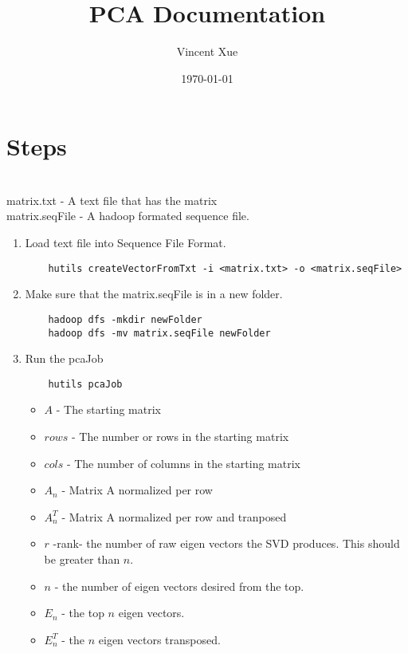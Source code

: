 \documentclass[a4paper]{article}
\title{PCA Documentation}
\author{Vincent Xue}
\date{\today}
\begin{document}
\maketitle
\section{Steps}
\\matrix.txt - A text file that has the matrix
\\matrix.seqFile - A hadoop formated sequence file.

\begin{enumerate}
\item Load text file into Sequence File Format.
\begin{lstlisting}
	hutils createVectorFromTxt -i <matrix.txt> -o <matrix.seqFile> 
\end{lstlisting}
\item Make sure that the matrix.seqFile is in a new folder.
\begin{lstlisting}
	hadoop dfs -mkdir newFolder
	hadoop dfs -mv matrix.seqFile newFolder
\end{lstlisting}

\item Run the pcaJob
	\begin{lstlisting}
	hutils pcaJob
	\end{lstlisting}
	\begin{itemize}
	\item $A$ - The starting matrix
	\item $rows$ - The number or rows in the starting matrix
	\item $cols$ - The number of columns in the starting matrix
	\item $A_n$ - Matrix A normalized per row
	\item $A_n^T$ - Matrix A normalized per row and tranposed
	\item $r$ -rank-  the number of raw eigen vectors the SVD produces. This should be greater than $n$.
	\item $n$ - the number of eigen vectors desired from the top.
	\item $E_{n}$ - the top $n$ eigen vectors.
	\item $E_{n}^T$ - the $n$ eigen vectors transposed.


\end{itemize}
\end{enumerate}
\end{document}
